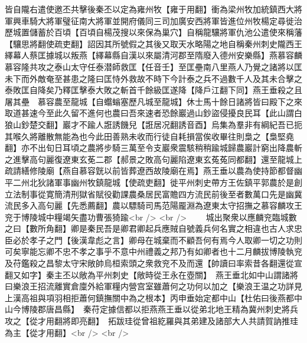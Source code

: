 皆自隴右遣使邀丕共擊後秦丕以定為雍州牧【雍于用翻】衝為梁州牧加統鎮西大將軍興車騎大將軍璧征南大將軍並開府儀同三司加廣安西將軍皆進位州牧楊定尋徙治歷城置儲蓄於百頃【百頃自楊茂搜以來保為巢穴】自稱龍驤將軍仇池公遣使來稱藩【驤思將翻使疏吏翻】詔因其所號假之其後又取天水略陽之地自稱秦州刺史隴西王　繹幕人蔡匡據城以叛燕【繹幕縣自漢以來屬清河郡至隋廢入德州安樂縣】燕慕容麟慕容隆共攻之泰山太守任泰潜師救匡【任音壬】至匡壘南八里燕人乃覺之諸將以匡未下而外敵奄至甚患之隆曰匡恃外救故不時下今計泰之兵不過數千人及其未合擊之泰敗匡自降矣乃釋匡擊泰大敗之斬首千餘級匡遂降【降戶江翻下同】燕王垂殺之且屠其壘　慕容農至龍城【自蠮螉塞歷凡城至龍城】休士馬十餘日諸將皆曰殿下之來取道甚速今至此久留不進何也農曰吾來速者恐餘巖過山鈔盜侵擾良民耳【此山謂白狼山鈔楚交翻】巖才不踰人誑誘饑兒【誑居况翻誘音酉】烏集為羣非有綱紀吾已扼其喉久將離散無能為也今此田善熟未收而行徒自耗損當俟收畢往則梟之【梟堅堯翻】亦不出旬日耳頃之農將步騎三萬至令支巖衆震駭稍稍踰城歸農巖計窮出降農斬之進擊高句麗復遼東玄莬二郡【郝景之敗高句麗陷遼東玄菟菟同都翻】還至龍城上疏請繕修陵廟【燕自慕容皝以前皆葬遼西故陵廟在焉】燕王垂以農為使持節都督幽平二州北狄諸軍事幽州牧鎮龍城【使疏吏翻】徙平州刺史帶方王佐鎮平郭農於是創立法制事從寛簡清刑獄省賦役勸課農桑居民富贍四方流民前後至者數萬口先是幽冀流民多入高句麗【先悉薦翻】農以驃騎司馬范陽龎淵為遼東太守招撫之慕容麟攻王兖于博陵城中糧竭矢盡功曹張猗踰<br />
<br />
　　城出聚衆以應麟兖臨城數之曰【數所角翻】卿是秦民吾是卿君卿起兵應賊自號義兵何名實之相違也古人求忠臣必於孝子之門【後漢韋彪之言】卿母在城棄而不顧吾何有焉今人取卿一切之功則可矣寧能忘卿不忠不孝之事乎不意中州禮義之邦乃有如卿者也十二月麟拔博陵執兖及苻鑑殺之昌黎太守宋敞帥烏桓索頭之衆救兖不及而還【帥讀曰率索昔各翻還從宣翻又如字】秦主丕以敞為平州刺史【敞時從王永在壺關】　燕王垂北如中山謂諸將曰樂浪王招流離實倉廩外給軍糧内營宫室雖蕭何之功何以加之【樂浪王温之功詳見上漢高祖與項羽相拒蕭何鎮撫關中為之根本】丙申垂始定都中山【杜佑曰後燕都中山今博陵郡唐昌縣】　秦苻定據信都以拒燕燕王垂以從弟北地王精為冀州刺史將兵攻之【從才用翻將即亮翻】　拓跋珪從曾祖紇羅與其弟建及諸部大人共請賀訥推珪為主【從才用翻】<br />
<br />
